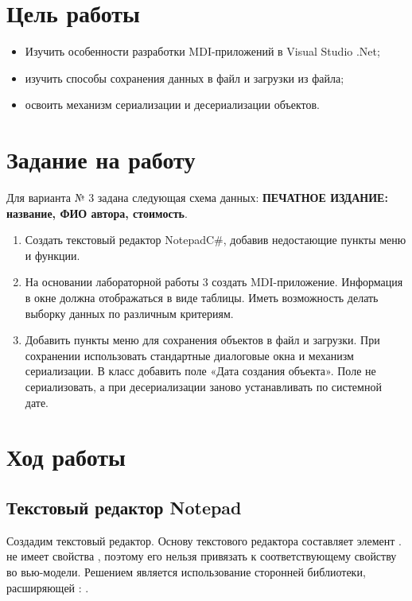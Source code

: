 \documentclass[a4paper,14pt]{extarticle}
\begin{document}


\section{Цель работы}
\begin{itemize}
    \item Изучить особенности разработки MDI-приложений в Visual Studio .Net;
    \item изучить способы сохранения данных в файл и загрузки из файла;
    \item освоить механизм сериализации и десериализации объектов.
\end{itemize}

\section{Задание на работу}
Для варианта № 3 задана следующая схема данных:
\textbf{ПЕЧАТНОЕ ИЗДАНИЕ: название, ФИО автора, стоимость}.
\begin{enumerate}
    \item Создать текстовый редактор NotepadC\#, добавив недостающие пункты меню и функции.
    \item На основании лабораторной работы 3 создать MDI-приложение. Информация в окне
    должна отображаться в виде таблицы. Иметь возможность делать выборку данных по
    различным критериям.
    \item Добавить пункты меню для сохранения объектов в файл и загрузки. При сохранении
    использовать стандартные диалоговые окна и механизм сериализации. В класс добавить
    поле «Дата создания объекта». Поле не сериализовать, а при десериализации заново
    устанавливать по системной дате.
\end{enumerate}

\section{Ход работы}
\subsection{Текстовый редактор Notepad}
Создадим текстовый редактор. Основу текстового редактора составляет элемент
.  не имеет свойства , поэтому
его нельзя привязать к соответствующему свойству во вью-модели. Решением является
использование сторонней библиотеки, расширяющей : .
\end{document}
